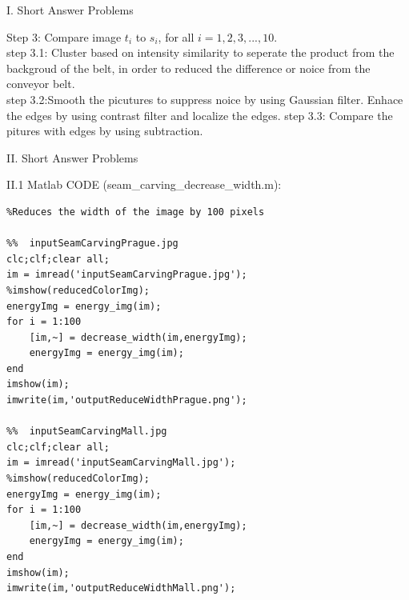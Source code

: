 \documentclass[a4paper,12pt]{article}
\begin{document}
\begin{section}{I. Short Answer Problems}
\begin{subsection}{4}
Step 3: Compare image $t_i$ to $s_i$, for all $i = 1, 2,3,...,10$.\\
step 3.1: Cluster based on intensity similarity to seperate the product from the backgroud of the belt, in order to reduced the difference or noice from the conveyor belt. \\
step 3.2:Smooth the picutures to suppress noice by using Gaussian filter. Enhace the edges by using contrast filter and localize the edges.
step 3.3: Compare the pitures with edges by using subtraction.\\


\end{subsection}

\end{section}


\begin{section}{II. Short Answer Problems}
\begin{subsection}{II.1}
Matlab CODE (seam\_carving\_decrease\_width.m):\\
\begin{lstlisting}[frame=single]  % Start your code-block
%seam_carving_decrease_width.m 
%Reduces the width of the image by 100 pixels

%%  inputSeamCarvingPrague.jpg
clc;clf;clear all;
im = imread('inputSeamCarvingPrague.jpg');
%imshow(reducedColorImg);
energyImg = energy_img(im);
for i = 1:100
    [im,~] = decrease_width(im,energyImg);
    energyImg = energy_img(im);
end
imshow(im);
imwrite(im,'outputReduceWidthPrague.png');

%%  inputSeamCarvingMall.jpg
clc;clf;clear all;
im = imread('inputSeamCarvingMall.jpg');
%imshow(reducedColorImg);
energyImg = energy_img(im);
for i = 1:100
    [im,~] = decrease_width(im,energyImg);
    energyImg = energy_img(im);
end
imshow(im);
imwrite(im,'outputReduceWidthMall.png');

\end{lstlisting}


\end{subsection}
\end{section}
\end{document}
